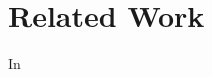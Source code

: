 \documentclass[]{article}
\begin{document}
\section{Related Work}
In \cite{MSAli2008} \cite{OO2009} \cite{KSKO2017} \cite{MTK2011}	
	

	

\printbibliography
\end{document}
